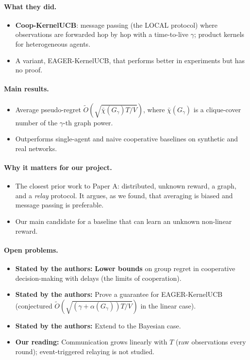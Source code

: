 \documentclass[11pt]{article}
\newcommand{\stated}{\textcolor{green!40!black}{\textbf{Stated by the authors:}}}
\newcommand{\ours}{\textcolor{orange!80!black}{\textbf{Our reading:}}}
\begin{document}
\paragraph{What they did.}
\begin{itemize}\item \textbf{Coop-KernelUCB}: message passing (the LOCAL protocol) where observations are forwarded hop by hop with a time-to-live $\gamma$; product kernels for heterogeneous agents.\item A variant, EAGER-KernelUCB, that performs better in experiments but has no proof.\end{itemize}
\paragraph{Main results.}
\begin{itemize}\item Average pseudo-regret $\tilde O(\sqrt{\bar\chi(G_\gamma)T/V})$, where $\bar\chi(G_\gamma)$ is a clique-cover number of the $\gamma$-th graph power.\item Outperforms single-agent and naive cooperative baselines on synthetic and real networks.\end{itemize}
\paragraph{Why it matters for our project.}
\begin{itemize}\item The closest prior work to Paper A: distributed, unknown reward, a graph, and a \emph{relay} protocol. It argues, as we found, that averaging is biased and message passing is preferable.\item Our main candidate for a baseline that can learn an unknown non-linear reward.\end{itemize}
\paragraph{Open problems.}
\begin{itemize}\item \stated{} \textbf{Lower bounds} on group regret in cooperative decision-making with delays (the limits of cooperation).\item \stated{} Prove a guarantee for EAGER-KernelUCB (conjectured $\tilde O(\sqrt{(\gamma+\alpha(G_\gamma))T/V})$ in the linear case).\item \stated{} Extend to the Bayesian case.\item \ours{} Communication grows linearly with $T$ (raw observations every round); event-triggered relaying is not studied.\end{itemize}
\end{document}
